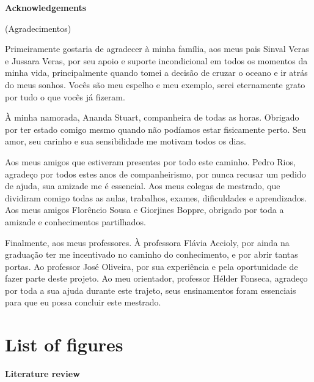 \documentclass[12pt]{article}
\def\blankpage{%
      \clearpage%
      \thispagestyle{empty}%
      \addtocounter{page}{+0}%
      \null%
      \clearpage}
\begin{document}
\blankpage

\begin{center}
\large{\textbf{Acknowledgements}}

(Agradecimentos)
\end{center}
\vspace{1em}

Primeiramente gostaria de agradecer à minha família, aos meus pais Sinval Veras e Jussara Veras, por seu apoio e suporte incondicional em todos os momentos da minha vida, principalmente quando tomei a decisão de cruzar o oceano e ir atrás do meus sonhos. Vocês são meu espelho e meu exemplo, serei eternamente grato por tudo o que vocês já fizeram.

À minha namorada, Ananda Stuart, companheira de todas as horas. Obrigado por ter estado comigo mesmo quando não podíamos estar fisicamente perto. Seu amor, seu carinho e sua sensibilidade me motivam todos os dias.

Aos meus amigos que estiveram presentes por todo este caminho. Pedro Rios, agradeço por todos estes anos de companheirismo, por nunca recusar um pedido de ajuda, sua amizade me é essencial. Aos meus colegas de mestrado, que dividiram comigo todas as aulas, trabalhos, exames, dificuldades e aprendizados. Aos meus amigos Florêncio Sousa e Giorjines Boppre, obrigado por toda a amizade e conhecimentos partilhados.

Finalmente, aos meus professores. À professora Flávia Accioly, por ainda na graduação ter me incentivado no caminho do conhecimento, e por abrir tantas portas. Ao professor José Oliveira, por sua experiência e pela oportunidade de fazer parte deste projeto. Ao meu orientador, professor Hélder Fonseca, agradeço por toda a sua ajuda durante este trajeto, seus ensinamentos foram essenciais para que eu possa concluir este mestrado.

\blankpage

\renewcommand{\contentsname}{\centerline{\bfseries\Large Table of Contents \vspace{1em}}}
\tableofcontents
\blankpage

\section*{\hfil List of figures \hfil}
\vspace{0.5em}

\noindent \textbf{Literature review}
\end{document}
